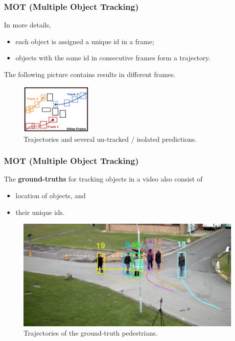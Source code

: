 \documentclass[slidetop, mathserif]{beamer}
\begin{document}
\begin{frame}
	\frametitle{MOT (Multiple Object Tracking)}
	
	In more details, 
	\begin{itemize}
	\item each object is assigned a unique id in a frame;
	\item objects with the same id in consecutive frames form a trajectory.
	\end{itemize}
	
	\vspace{3pt}

	The following picture contains results in different frames.
	
	\begin{figure}
		\includegraphics[height=70pt]{pics/fig1.png}
		\caption{Trajectories and several un-tracked / isolated predictions.}
	\end{figure}
	
\end{frame}

\begin{frame}
	\frametitle{MOT (Multiple Object Tracking)}
	
	The {\bf ground-truths} for tracking objects in a video also consist of
	\begin{itemize}
	\item location of objects, and
	\item their unique ids.
	\end{itemize}

	\begin{figure}
		\includegraphics[width=.7\textwidth]{pics/track02.png}
		\caption{Trajectories of the ground-truth pedestrians.}
	\end{figure}

\end{frame}
\end{document}
